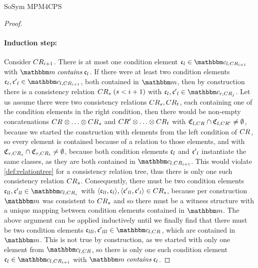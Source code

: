 \begin{copiedFrom}{SoSym MPM4CPS}
\begin{proof}
    \paragraph{Induction step:}
    Consider $CR_{i+1}$.
    There is at most one condition element $\conditionelement{c}{l} \in \condition{c}{l, \consistencyrelation{CR}{i+1}}$ with $\modelset{m} \containsmath \conditionelement{c}{l}$.
    If there were at least two condition elements $\conditionelement{c}{l}, \conditionelement{c'}{l} \in \condition{c}{l,\consistencyrelation{CR}{i+1}}$, both contained in $\modelset{m}$, then by construction there is a consistency relation $CR_{s}\; (s < i+1)$ with $\conditionelement{c}{l},\conditionelement{c'}{l} \in \condition{c}{r,\consistencyrelation{CR}{j}}$.
    Let us assume there were two consistency relations $CR_{s}, CR_{t}$, each containing one of the condition elements in the right condition, then there would be non-empty concatenations $\consistencyrelation{CR}{} \concat \dots \concat \consistencyrelation{CR}{s}$ and $\consistencyrelation{CR'}{} \concat \dots \concat \consistencyrelation{CR}{t}$ with $\mathfrak{C}_{l,CR_{}} \cap \mathfrak{C}_{l,CR'_{}} \neq \emptyset$, because we started the construction with elements from the left condition of $CR_{}$, so every element is contained because of a relation to those elements, and with $\mathfrak{C}_{r,CR_{s}} \cap \mathfrak{C}_{r,CR_{t}} \neq \emptyset$, because both condition elements $\mathfrak{c}_{l}$ and $\mathfrak{c'}_{l}$ instantiate the same classes, as they are both contained in $\condition{c}{l,\consistencyrelation{CR}{i+1}}$.
    This would violate \autoref{def:relationtree} for a consistency relation tree, thus there is only one such consistency relation $CR_{s}$.
    Consequently, there must be two condition elements $\conditionelement{c}{ll}, \conditionelement{c'}{ll} \in \condition{c}{l,\consistencyrelation{CR}{s}}$ with $\langle \mathfrak{c}_{ll},\mathfrak{c}_{l} \rangle, \langle \mathfrak{c'}_{ll},\mathfrak{c'}_{l} \rangle \in CR_{s}$, because per construction $\modelset{m}$ was consistent to $CR_{s}$ and so there must be a witness structure with a unique mapping between condition elements contained in $\modelset{m}$.
    The above argument can be applied inductively until we finally find that there must be two condition elements $\conditionelement{c}{lll},\conditionelement{c'}{lll} \in \condition{c}{l,\consistencyrelation{CR}{}}$, which are contained in $\modelset{m}$.
    This is not true by construction, as we started with only one element from $\condition{c}{l,\consistencyrelation{CR}{}}$, so there is only one such condition element $\conditionelement{c}{l} \in \condition{c}{l,\consistencyrelation{CR}{i+1}}$ with $\modelset{m} \containsmath \conditionelement{c}{l}$.
    

\end{proof}
\end{copiedFrom}
